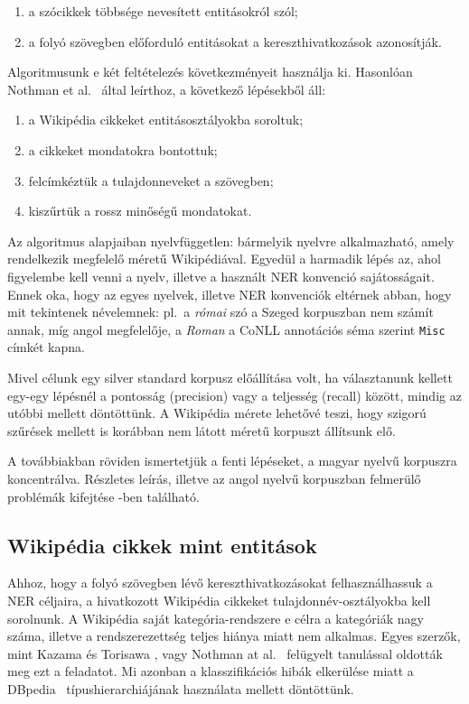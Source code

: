 \documentclass{llncs}
\begin{document}
\begin{enumerate}
\item a szócikkek többsége nevesített entitásokról szól;
\item a folyó szövegben előforduló entitásokat a kereszthivatkozások
      azonosítják.
\end{enumerate}

Algoritmusunk e két feltételezés következményeit használja ki. Hasonlóan Nothman
et al.~\cite{Nothman:08} által leírthoz, a következő lépésekből áll:

\begin{enumerate}
\item a Wikipédia cikkeket entitásosztályokba soroltuk;
\item a cikkeket mondatokra bontottuk;
\item felcímkéztük a tulajdonneveket a szövegben;
\item kiszűrtük a rossz minőségű mondatokat.
\end{enumerate}

Az algoritmus alapjaiban nyelvfüggetlen: bármelyik nyelvre alkalmazható, amely
rendelkezik megfelelő méretű Wikipédiával. Egyedül a harmadik lépés az, ahol
figyelembe kell venni a nyelv, illetve a használt NER konvenció sajátosságait.
Ennek oka, hogy az egyes nyelvek, illetve NER konvenciók eltérnek abban, hogy
mit tekintenek névelemnek: pl.~a \textit{római} szó a Szeged korpuszban nem
számít annak, míg angol megfelelője, a \textit{Roman} a CoNLL annotációs séma
szerint \texttt{Misc} címkét kapna.

Mivel célunk egy silver standard korpusz előállítása volt, ha választanunk
kellett egy-egy lépésnél a pontosság (precision) vagy a teljesség (recall)
között, mindig az utóbbi mellett döntöttünk. A Wikipédia mérete lehetővé teszi,
hogy szigorú szűrések mellett is korábban nem látott méretű korpuszt állítsunk elő.

A továbbiakban röviden ismertetjük a fenti lépéseket, a magyar nyelvű korpuszra
koncentrálva. Részletes leírás, illetve az angol nyelvű korpuszban felmerülő
problémák kifejtése \cite{simon-nemeskey:2012:NEWS2012}-ben található.

\subsection{Wikipédia cikkek mint entitások}
\label{corpusbuilding:entities}

Ahhoz, hogy a folyó szövegben lévő kereszthivatkozásokat felhasználhassuk a
NER céljaira, a hivatkozott Wikipédia cikkeket tulajdonnév-osztályokba kell
sorolnunk. A Wikipédia saját kategória-rendszere e célra a kategóriák nagy
száma, illetve a rendszerezettség teljes hiánya miatt nem alkalmas. Egyes
szerzők, mint Kazama és Torisawa \cite{KaTo07}, vagy Nothman at
al.~\cite{Nothman:08} felügyelt tanulással oldották meg ezt a feladatot. Mi
azonban a klasszifikációs hibák elkerülése miatt a DBpedia~\cite{Bizer:09}
típushierarchiájának használata mellett döntöttünk.
\end{document}
